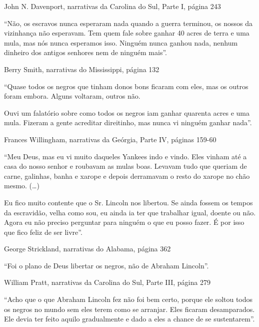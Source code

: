 John N. Davenport, narrativas da Carolina do Sul, Parte I, página 243

``Não, os escravos nunca esperaram nada quando a guerra terminou, os
nossos da vizinhança não esperavam. Tem quem fale sobre ganhar 40 acres
de terra e uma mula, mas nós nunca esperamos isso. Ninguém nunca ganhou
nada, nenhum dinheiro dos antigos senhores nem de ninguém mais''.

Berry Smith, narrativas do Mississippi, página 132

``Quase todos os negros que tinham donos bons ficaram com eles, mas os
outros foram embora. Alguns voltaram, outros não.

Ouvi um falatório sobre como todos os negros iam ganhar quarenta acres e
uma mula. Fizeram a gente acreditar direitinho, mas nunca vi ninguém
ganhar nada''.

Frances Willingham, narrativas da Geórgia, Parte IV, páginas 159-60

``Meu Deus, mas eu vi muito daqueles Yankees indo e vindo. Eles vinham
até a casa do nosso senhor e roubavam as mulas boas. Levavam tudo que
queriam de carne, galinhas, banha e xarope e depois derramavam o resto
do xarope no chão mesmo. (\ldots{})

Eu fico muito contente que o Sr. Lincoln nos libertou. Se ainda fossem
os tempos da escravidão, velha como sou, eu ainda ia ter que trabalhar
igual, doente ou não. Agora eu não preciso perguntar para ninguém o que
eu posso fazer. É por isso que fico feliz de ser livre''.

George Strickland, narrativas do Alabama, página 362

``Foi o plano de Deus libertar os negros, não de Abraham Lincoln''.

William Pratt, narrativas da Carolina do Sul, Parte III, página 279

``Acho que o que Abraham Lincoln fez não foi bem certo, porque ele
soltou todos os negros no mundo sem eles terem como se arranjar. Eles
ficaram desamparados. Ele devia ter feito aquilo gradualmente e dado a
eles a chance de se sustentarem''.
